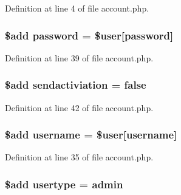 Definition at line 4 of file account.\+php.

\subsubsection[{\texorpdfstring{password}{password}}]{\setlength{\rightskip}{0pt plus 5cm}\${\bf add} password = \${\bf user}\mbox{[}\textquotesingle{}password\textquotesingle{}\mbox{]}}\hypertarget{actions_2account_8php_a3ef39d3ee8b2bcca6a288308549ccb44}{}\label{actions_2account_8php_a3ef39d3ee8b2bcca6a288308549ccb44}


Definition at line 39 of file account.\+php.

\subsubsection[{\texorpdfstring{sendactiviation}{sendactiviation}}]{\setlength{\rightskip}{0pt plus 5cm}\${\bf add} sendactiviation = false}\hypertarget{actions_2account_8php_a11fe66faec6579a15979e62879ba8950}{}\label{actions_2account_8php_a11fe66faec6579a15979e62879ba8950}


Definition at line 42 of file account.\+php.

\subsubsection[{\texorpdfstring{username}{username}}]{\setlength{\rightskip}{0pt plus 5cm}\${\bf add} username = \${\bf user}\mbox{[}\textquotesingle{}username\textquotesingle{}\mbox{]}}\hypertarget{actions_2account_8php_ac9b3768ccc688c2ff0811c50c107a02e}{}\label{actions_2account_8php_ac9b3768ccc688c2ff0811c50c107a02e}


Definition at line 35 of file account.\+php.

\subsubsection[{\texorpdfstring{usertype}{usertype}}]{\setlength{\rightskip}{0pt plus 5cm}\${\bf add} usertype = \textquotesingle{}admin\textquotesingle{}}\hypertarget{actions_2account_8php_a13a7b92f40fdd23da18bc3eb7dcfd346}{}\label{actions_2account_8php_a13a7b92f40fdd23da18bc3eb7dcfd346}


